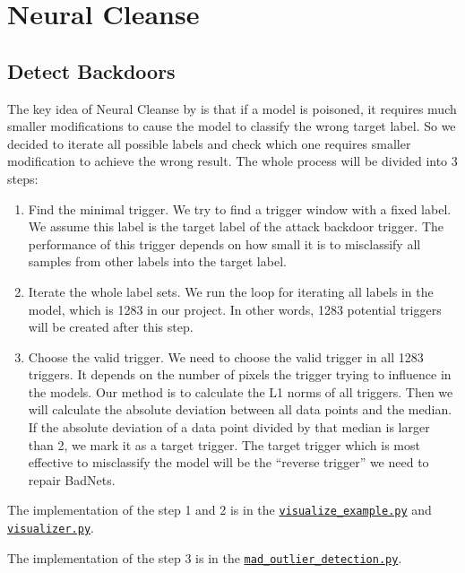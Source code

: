 \documentclass[letterpaper]{article}
\begin{document}
\newpage
\section*{Neural Cleanse}
\subsection*{Detect Backdoors}
The key idea of Neural Cleanse\footnotemark{} by  \cite{wang2019neural} is that if a model is poisoned, it requires much smaller modifications to cause the model to classify the wrong target label. So we decided to iterate all possible labels and check which one requires smaller modification to achieve the wrong result. The whole process will be divided into 3 steps:

\begin{enumerate}
    \item Find the minimal trigger. We try to find a trigger window with a fixed label. We assume this label is the target label of the attack backdoor trigger. The performance of this trigger depends on how small it is to misclassify all samples from other labels into the target label.
    
    \item Iterate the whole label sets. We run the loop for iterating all labels in the model, which is 1283 in our project. In other words, 1283 potential triggers will be created after this step.
    
    \item Choose the valid trigger. We need to choose the valid trigger in all 1283 triggers. It depends on the number of pixels the trigger trying to influence in the models. Our method is to calculate the L1 norms of all triggers. Then we will calculate the absolute deviation between all data points and the median. If the absolute deviation of a data point divided by that median is larger than 2, we mark it as a target trigger. The target trigger which is most effective to misclassify the model will be the ``reverse trigger'' we need to repair BadNets.
\end{enumerate}
The implementation of the step 1 and 2 is in the \href{https://github.com/zjzsliyang/CSAW-HackML-2020/blob/master/visualize_example.py}{\texttt{visualize\_example.py}} and \href{https://github.com/zjzsliyang/CSAW-HackML-2020/blob/master/visualizer.py}{\texttt{visualizer.py}}.

The implementation of the step 3 is in the \href{https://github.com/zjzsliyang/CSAW-HackML-2020/blob/master/mad_outlier_detection.py}{\texttt{mad\_outlier\_detection.py}}.
\end{document}
